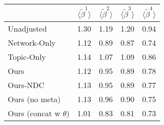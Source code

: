 \begin{tabular}{lrrrr}
\toprule
{} &  $\langle\tilde{\beta}^1\rangle$ &  $\langle\tilde{\beta}^2\rangle$ &  $\langle\tilde{\beta}^3\rangle$ &  $\langle\tilde{\beta}^4\rangle$ \\
\midrule
Unadjusted               &                             1.30 &                             1.19 &                             1.20 &                             0.94 \\
Network-Only             &                             1.12 &                             0.89 &                             0.87 &                             0.74 \\
Topic-Only               &                             1.14 &                             1.07 &                             1.09 &                             0.86 \\
Ours                     &                             1.12 &                             0.95 &                             0.89 &                             0.78 \\
Ours-NDC                 &                             1.13 &                             0.95 &                             0.89 &                             0.77 \\
Ours (no meta)           &                             1.13 &                             0.96 &                             0.90 &                             0.75 \\
Ours (concat w $\theta$) &                             1.01 &                             0.83 &                             0.81 &                             0.73 \\
\bottomrule
\end{tabular}
